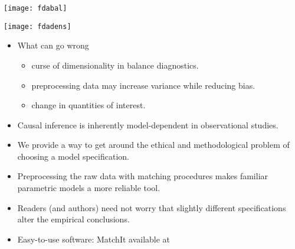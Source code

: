 \documentclass[20pt,landscape,pdftex]{foils}
\begin{document}
\hypersetup{pdfpagetransition=Replace}

\vspace*{1in}
\begin{center}
  \texttt{[image: fdabal]}\pause 
\end{center}


\hypersetup{pdfpagetransition=Replace}

\vspace*{1in}
\begin{center}
  \texttt{[image: fdadens]}\pause 
\end{center}



\hypersetup{pdfpagetransition=Replace}

\begin{itemize}

\item What can go wrong\pause
  \begin{itemize}
  \item curse of dimensionality in balance diagnostics.\pause
  \item preprocessing data may increase variance while reducing
    bias.\pause 
  \item change in quantities of interest.\pause
  \end{itemize}
  
\item Causal inference is inherently model-dependent in observational
  studies.\pause

\item We provide a way to get around the ethical and methodological
  problem of choosing a model specification.\pause

\item Preprocessing the raw data with matching procedures makes
  familiar parametric models a more reliable tool.\pause

\item Readers (and authors) need not worry that slightly different
  specifications alter the empirical conclusions.\pause

\item Easy-to-use software: MatchIt available at
  \pause

\end{itemize}
\end{document}
